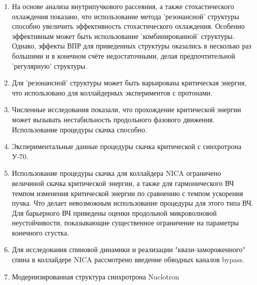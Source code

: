 \begin{enumerate}
  \item На основе анализа внутрипучкового рассеяния, а также стохастического охлаждения показано, что использование метода 'резонансной' структуры способно увеличить эффективность стохастического охлаждения. Особенно эффективным может быть использование 'комбинированной' структуры. Однако, эффекты ВПР для приведенных структуры оказались в несколько раз большими и в конечном счёте недостаточными, делая предпочтительной 'регулярную' структуры.
  \item Для 'резонансной' структуры может быть варьирована критическая энергия, что использовано для коллайдерных экспериментов с протонами.
  \item Численные исследования показали, что прохождение критической энергии может вызывать нестабильность продольного фазового движения. Использование процедуры скачка способно. 
  \item Экспериментальные данные процедуры скачка критической с синхротрона У-70.
  \item Использование процедуры скачка для коллайдера NICA ограничено величиной скачка критической энергии, а также для гармонического ВЧ темпом изменения критической энергии по сравнению с темпом ускорения пучка. Что делает невозможным использование процедуры для этого типа ВЧ. Для барьерного ВЧ приведены оценки продольной микроволновой неустойчивости, показывающие существенное ограничение на параметры конечного сгустка.
  \item Для исследования спиновой динамики и реализации "квази-замороженного" спина в коллайдере NICA рассмотрено введение обводных каналов bypass.
  \item Модернизированная структура синхротрона Nuclotron 
\end{enumerate}
